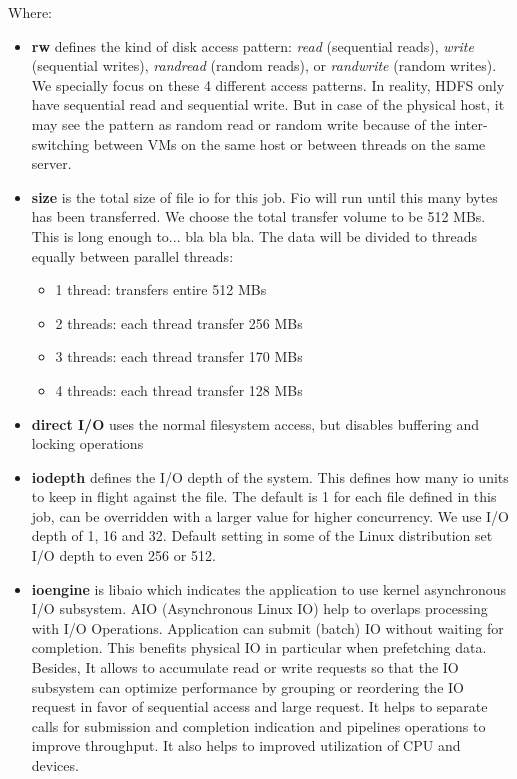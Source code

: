 \documentclass{acmsig}
\begin{document}
Where:
\begin{itemize}
  \item \textbf{rw} defines the kind of disk access pattern: \textit{read} (sequential reads), \textit{write} (sequential writes), \textit{randread} (random reads), or \textit{randwrite} (random writes). We specially focus on these 4 different access patterns. In reality, HDFS only have sequential read and sequential write. But in case of the physical host, it may see the pattern as random read or random write because of the inter-switching between VMs on the same host or between threads on the same server.
  \item \textbf{size} is the total size of file io for this job. Fio will run until this many bytes has been transferred. We choose the total transfer volume to be 512 MBs. This is long enough to... bla bla bla. The data will be divided to threads equally between parallel threads:
  \begin{itemize}
    \item 1 thread: transfers entire 512 MBs
    \item 2 threads: each thread transfer 256 MBs
    \item 3 threads: each thread transfer 170 MBs
    \item 4 threads: each thread transfer 128 MBs
  \end{itemize}
  \item \textbf{direct I/O} uses the normal filesystem access, but disables buffering and locking operations
  \item \textbf{iodepth} defines the I/O depth of the system. This defines how many io units to keep in flight against the file. The default is 1 for each file defined in this job, can be overridden with a larger value for higher concurrency. We use I/O depth of 1, 16 and 32. Default setting in some of the Linux distribution set I/O depth to even 256 or 512.
  \item \textbf{ioengine} is libaio which indicates the application to use kernel asynchronous I/O subsystem. AIO (Asynchronous Linux IO) help to overlaps processing with I/O Operations. Application can submit (batch) IO without waiting for completion. This benefits physical IO in particular when prefetching data. Besides, It allows to accumulate read or write requests so that the IO subsystem can optimize performance by grouping or reordering the IO request in favor of sequential access and large request. It helps to separate calls for submission and completion indication and pipelines operations to improve throughput. It also helps to improved utilization of CPU and devices.
\end{itemize}
\end{document}
